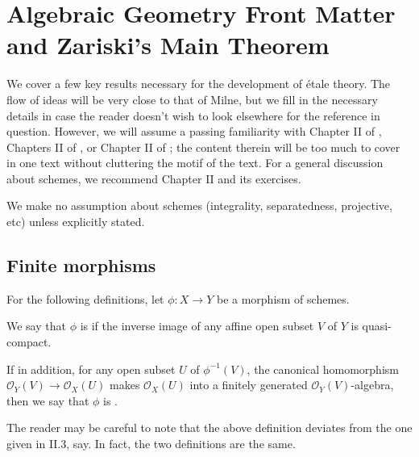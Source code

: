 \chapter{Algebraic Geometry Front Matter and Zariski's Main 
Theorem}
\label{sect_zariski}

\renewcommand{\O}{\mathcal{O}}

We cover a few key results necessary for the development of 
\'etale theory. The flow of ideas will be very close to that of 
Milne, but we fill in the necessary details in case the reader 
doesn't wish to look elsewhere for the reference in question. 
However, we will assume a passing familiarity with Chapter II of 
\cite{Hart}, Chapters II of \cite{Liu}, or Chapter II of 
\cite{Mum}; the content therein will be too much to cover in one 
text without cluttering the motif of the text. For a general 
discussion about schemes, we recommend \cite{Hart} Chapter II
and its exercises.

We make no assumption about schemes (integrality, separatedness, 
projective, etc) unless explicitly stated. 

\section{Finite morphisms}

For the following definitions, let $\phi: X \to Y$ be a morphism of 
schemes.

\begin{defn}
We say that $\phi$ is 
if the inverse image of any affine open subset $V$ of $Y$ is
quasi-compact. 

If in addition, for any open subset $U$ of $\phi^{-1}(V)$, the 
canonical homomorphism $\O_Y(V) \to \O_X(U)$ makes $\O_X(U)$ into 
a finitely generated $\O_Y(V)$-algebra, then we say that $\phi$ is 
.
\end{defn}

The reader may be careful to note that the above definition
deviates from the one given in \cite{Hart} II.3, say. In fact,
the two definitions are the same.

